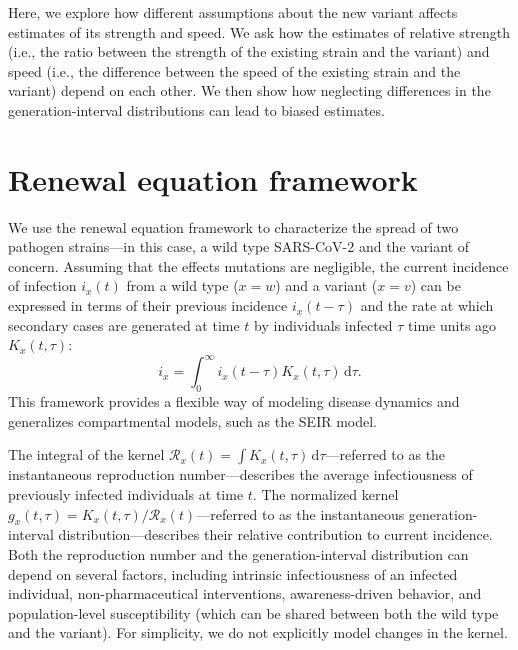 \documentclass[12pt]{article}
\newcommand{\RR}{\ensuremath{{\mathcal R}}\xspace}
\newcommand{\dd}[1]{\ensuremath{\, \mathrm{d}#1}}
\newcommand{\dtau}{\dd{\tau}}
\begin{document}
Here, we explore how different assumptions about the new variant affects estimates of its strength and speed.
We ask how the estimates of relative strength (i.e., the ratio between the strength of the existing strain and the variant) and speed (i.e., the difference between the speed of the existing strain and the variant) depend on each other.
We then show how neglecting differences in the generation-interval distributions can lead to biased estimates.

\section{Renewal equation framework}

We use the renewal equation framework to characterize the spread of two pathogen strains---in this case, a wild type SARS-CoV-2 and the variant of concern.
Assuming that the effects mutations are negligible, the current incidence of infection $i_x(t)$ from a wild type ($x=w$) and a variant ($x=v$) can be expressed in terms of their previous incidence $i_x(t-\tau)$ and the rate at which secondary cases are generated at time $t$ by individuals infected $\tau$ time units ago $K_x(t, \tau)$:
\begin{equation}
i_x = \int_0^\infty i_x(t-\tau) K_x(t, \tau) \dtau.
\end{equation}
This framework provides a flexible way of modeling disease dynamics and generalizes compartmental models, such as the SEIR model.

The integral of the kernel $\RR_x(t) = \int K_x(t, \tau) \dtau$---referred to as the instantaneous reproduction number---describes the average infectiousness of previously infected individuals at time $t$.
The normalized kernel $g_x(t, \tau) = K_x(t, \tau)/\RR_x(t)$---referred to as the instantaneous generation-interval distribution---describes their relative contribution to current incidence.
Both the reproduction number and the generation-interval distribution can depend on several factors, including intrinsic infectiousness of an infected individual, non-pharmaceutical interventions, awareness-driven behavior, and population-level susceptibility (which can be shared between both the wild type and the variant).
For simplicity, we do not explicitly model changes in the kernel.
\end{document}
